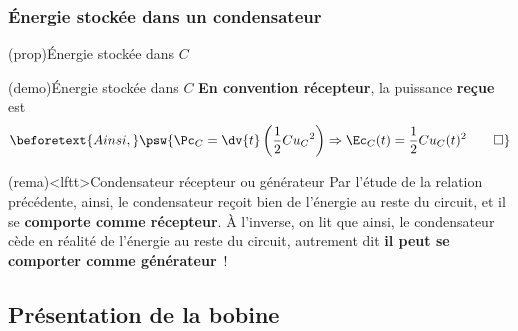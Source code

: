 \documentclass[../../main/main.tex]{subfiles}
\begin{document}
\vspace{-15pt}
\subsubsection{Énergie stockée dans un condensateur}

\begin{tcb*}[label=prop:Ec](prop){Énergie stockée dans $C$}
	\psw{%
	\[
		\boxed{\Ec_C(t) = \frac{1}{2}C u_C{}^2(t)}
	\]
	}%
	\vspace{-10pt}
\end{tcb*}

\begin{tcb*}(demo){Énergie stockée dans $C$}
	\textbf{En convention récepteur}, la puissance \textbf{reçue} est
	\vspace{-15pt}
	{}
	\smallbreak
	\begin{gather*}
		\beforetext{Ainsi,}
		\psw{%
			\Pc_{C} = \dv{t} \left( \frac{1}{2} Cu_C{}^2 \right)
			\Rightarrow \Ec_C(t) = \frac{1}{2}C u_C(t)^2
			\qed
		}%
	\end{gather*}
	\vspace{-15pt}
\end{tcb*}

\begin{tcb}[label=rema:genrec, sidebyside](rema)<lftt>{Condensateur récepteur ou
			générateur}
	Par l'étude de la relation précédente,
	ainsi, le condensateur reçoit bien de l'énergie au reste du circuit, et il se
	\textbf{comporte comme récepteur}.
	\tcblower
	À l'inverse, on lit que
	ainsi, le condensateur cède en réalité de l'énergie au reste du circuit,
	autrement dit \textbf{il peut se comporter comme générateur}~!
\end{tcb}

\subsection{Présentation de la bobine}
\end{document}
